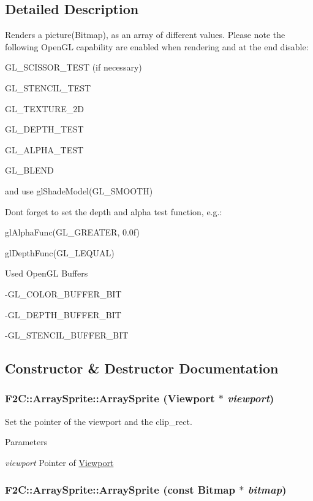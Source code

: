 \subsection{Detailed Description}
Renders a picture(Bitmap), as an array of different values. Please note the following OpenGL capability are enabled when rendering and at the end disable: \par
 GL\_\-SCISSOR\_\-TEST (if necessary) \par
 GL\_\-STENCIL\_\-TEST \par
 GL\_\-TEXTURE\_\-2D \par
 GL\_\-DEPTH\_\-TEST \par
 GL\_\-ALPHA\_\-TEST \par
 GL\_\-BLEND \par
 and use glShadeModel(GL\_\-SMOOTH) \par
 \par
 Dont forget to set the depth and alpha test function, e.g.: \par
 glAlphaFunc(GL\_\-GREATER, 0.0f) \par
 glDepthFunc(GL\_\-LEQUAL) \par
 \par
 Used OpenGL Buffers \par
 -\/GL\_\-COLOR\_\-BUFFER\_\-BIT \par
 -\/GL\_\-DEPTH\_\-BUFFER\_\-BIT \par
 -\/GL\_\-STENCIL\_\-BUFFER\_\-BIT \par
 

\subsection{Constructor \& Destructor Documentation}
\hypertarget{class_f2_c_1_1_array_sprite_a412ffea7593257bb399c109e9f0662f2}{
\subsubsection[{ArraySprite}]{\setlength{\rightskip}{0pt plus 5cm}F2C::ArraySprite::ArraySprite ({\bf Viewport} $\ast$ {\em viewport})}}
\label{class_f2_c_1_1_array_sprite_a412ffea7593257bb399c109e9f0662f2}


Set the pointer of the viewport and the clip\_\-rect. 
\begin{DoxyParams}{Parameters}
\item[{\em viewport}]Pointer of \hyperlink{class_f2_c_1_1_viewport}{Viewport} \end{DoxyParams}
\hypertarget{class_f2_c_1_1_array_sprite_a2caa4bd4c8ca99dab916ddb6b9d12666}{
\subsubsection[{ArraySprite}]{\setlength{\rightskip}{0pt plus 5cm}F2C::ArraySprite::ArraySprite (const {\bf Bitmap} $\ast$ {\em bitmap})}}
\label{class_f2_c_1_1_array_sprite_a2caa4bd4c8ca99dab916ddb6b9d12666}


